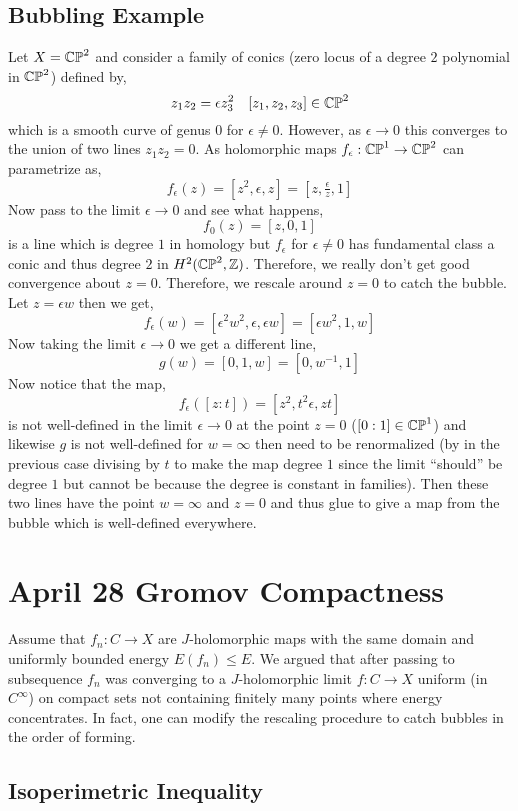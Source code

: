 \documentclass[12pt]{article}
\begin{document}
\subsection{Bubbling Example}

Let $X = \mathbb{CP}^2$ and consider a family of conics (zero locus of a degree $2$ polynomial in $\mathbb{CP}^2$) defined by,
\[ z_1 z_2 = \epsilon z_3^2 \quad [z_1, z_2, z_3] \in \mathbb{CP}^2 \]
which is a smooth curve of genus $0$ for $\epsilon \neq 0$. However, as $\epsilon \to 0$ this converges to the union of two lines $z_1 z_2 = 0$. As holomorphic maps $f_\epsilon : \mathbb{CP}^1 \to \mathbb{CP}^2$ can parametrize as,
\[ f_\epsilon(z) = [z^2, \epsilon, z] = [z, \tfrac{\epsilon}{z}, 1] \]
Now pass to the limit $\epsilon \to 0$ and see what happens,
\[ f_0(z) = [z,0,1] \]
is a line which is degree $1$ in homology but $f_\epsilon$ for $\epsilon \neq 0$ has fundamental class a conic and thus degree $2$ in $H^2(\mathbb{CP}^2, \mathbb{Z})$. Therefore, we really don't get good convergence about $z = 0$. Therefore, we rescale around $z = 0$ to catch the bubble. Let $z = \epsilon w$ then we get,
\[ f_\epsilon(w) = [\epsilon^2 w^2, \epsilon, \epsilon w] = [\epsilon w^2, 1, w]  \]
Now taking the limit $\epsilon \to 0$ we get a different line,
\[ g(w) = [0,1,w] = [0, w^{-1}, 1] \]
Now notice that the map,
\[ f_\epsilon([z : t]) = [z^2, t^2 \epsilon, z t] \]
is not well-defined in the limit $\epsilon \to 0$ at the point $z = 0$ ($[0:1] \in \mathbb{CP}^1$) and likewise $g$ is not well-defined for $w = \infty$ then need to be renormalized (by in the previous case divising by $t$ to make the map degree $1$ since the limit ``should'' be degree $1$ but cannot be because the degree is constant in families). 
Then these two lines have the point $w = \infty$ and $z = 0$ and thus glue to give a map from the bubble which is well-defined everywhere.

\section{April 28 Gromov Compactness}

Assume that $f_n : C \to X$ are $J$-holomorphic maps with the same domain and uniformly bounded energy $E(f_n) \le E$. We argued that after passing to subsequence $f_n$ was converging to a $J$-holomorphic limit $f : C \to X$ uniform (in $C^\infty$) on compact sets not containing finitely many points where energy concentrates. In fact, one can modify the rescaling procedure to catch bubbles in the order of forming. 

\subsection{Isoperimetric Inequality}
\end{document}
